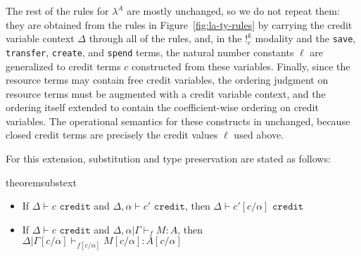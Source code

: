 


The rest of the rules for $\lambda^A$ are mostly unchanged, so we do not repeat them: they are obtained from the rules in Figure~\ref{fig:la-ty-rules} by carrying the credit variable context $\Delta$ through all of the rules, and,
in the $!^k_c$ modality and the \texttt{save}, \texttt{transfer},
\texttt{create}, and \texttt{spend} terms, the natural number constants
$\ell$ are generalized to credit terms $c$ constructed from these variables.
Finally, since the resource terms may contain free credit variables, the ordering judgment on resource terms must be augmented with a credit variable context, and the ordering itself extended to contain the coefficient-wise ordering on credit variables.
The operational semantics for these constructs in unchanged, because closed credit terms are
precisely the credit values $\ell$ used above.

For this extension, substitution and type preservation are stated as follows:

\begin{restatable}[Substitution]{theorem}{substext}\label{thm:subst-ext}
$\;$
\begin{itemize}
  \item If $\Delta \vdash c \texttt{ credit}$ and $\Delta,\alpha \vdash c' \texttt{ credit}$, then $\Delta \vdash c'[c/\alpha] \texttt{ credit}$
  \item If $\Delta \vdash c \texttt{ credit}$ and $\Delta,\alpha|\Gamma\vdash_f M : A$, then $\Delta|\Gamma[c/\alpha] \vdash_{f[c/\alpha]} M[c/\alpha] : A[c/\alpha]$
\end{itemize}
\end{restatable}

